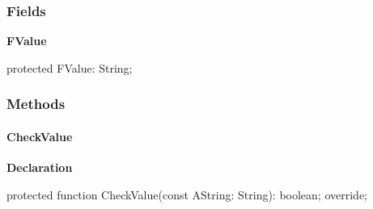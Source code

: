\documentclass{report}
\newif\ifpdf
\begin{document}
\subsubsection*{\large{\textbf{Fields}}\normalsize\hspace{1ex}\hfill}
\begin{list}{}{
\setlength{\itemindent}{0cm}
\setlength{\listparindent}{0cm}
\setlength{\leftmargin}{\evensidemargin}
\addtolength{\leftmargin}{\tmplength}
\settowidth{\labelsep}{X}
\addtolength{\leftmargin}{\labelsep}
\setlength{\labelwidth}{\tmplength}
}
\label{PasDoc_OptionParser.TStringOption-FValue}
\item[\textbf{FValue}\hfill]
\ifpdf
\begin{flushleft}
\fi
\begin{ttfamily}
protected FValue: String;\end{ttfamily}

\ifpdf
\end{flushleft}
\fi


\par  \end{list}
\subsubsection*{\large{\textbf{Methods}}\normalsize\hspace{1ex}\hfill}
\paragraph*{CheckValue}\hspace*{\fill}

\label{PasDoc_OptionParser.TStringOption-CheckValue}
\begin{list}{}{
\setlength{\itemindent}{0cm}
\setlength{\listparindent}{0cm}
\setlength{\leftmargin}{\evensidemargin}
\addtolength{\leftmargin}{\tmplength}
\settowidth{\labelsep}{X}
\addtolength{\leftmargin}{\labelsep}
\setlength{\labelwidth}{\tmplength}
}
\item[\textbf{Declaration}\hfill]
\ifpdf
\begin{flushleft}
\fi
\begin{ttfamily}
protected function CheckValue(const AString: String): boolean; override;\end{ttfamily}

\ifpdf
\end{flushleft}
\fi

\end{list}
\ifpdf
\end{document}
